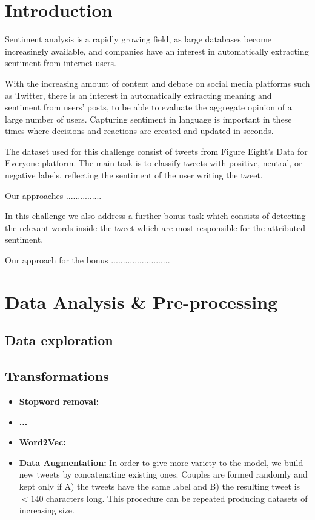 \documentclass{article}
\begin{document}
	
	
\section{Introduction}
Sentiment analysis is a rapidly growing field, as large databases become increasingly available, and companies have an interest in automatically extracting sentiment from internet users.

With the increasing amount of content and debate on social media platforms such as Twitter, there is an interest in automatically extracting meaning and sentiment from users' posts, to be able to evaluate the aggregate opinion of a large number of users. Capturing sentiment in language is important in these times where decisions and reactions are created and updated in seconds.

The dataset used for this challenge consist of tweets from Figure Eight's Data for Everyone platform. The main task is to classify tweets with positive, neutral, or negative labels, reflecting the sentiment of the user writing the tweet.

Our approaches ...............

In this challenge we also address a further bonus task which consists of detecting the relevant words inside the tweet which are most responsible for the attributed sentiment.

Our approach for the bonus .........................

\section{Data Analysis \& Pre-processing}
    \subsection{Data exploration}

    \subsection{Transformations}
	\begin{itemize}
		\item \textbf{Stopword removal:}
		\item \textbf{...}
		\item \textbf{Word2Vec:}
		\item \textbf{Data Augmentation:} In order to give more variety to the model, we build new tweets by concatenating existing ones. Couples are formed randomly and kept only if A) the tweets have the same label and B) the resulting tweet is $< 140$ characters long. This procedure can be repeated producing datasets of increasing size.
	\end{itemize}
\end{document}
